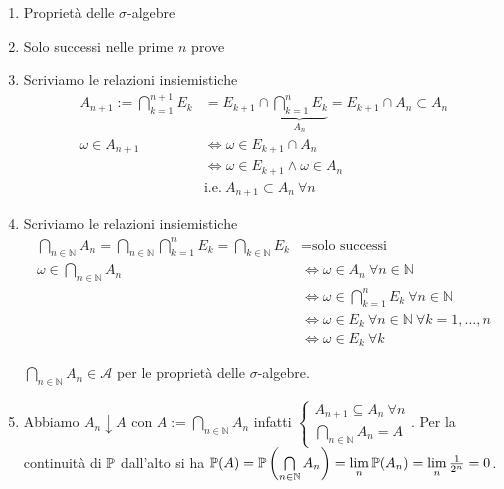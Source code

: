 \begin{enumerate}
\item Proprietà delle $\sigma $-algebre
\item Solo successi nelle prime $n$ prove
\item Scriviamo le relazioni insiemistiche\begin{align*}
A_{n+1} :=\bigcap\limits _{k=1}^{n+1} E_{k} & =E_{k+1} \cap \underbrace{\bigcap\limits _{k=1}^{n} E_{k}}_{A_{n}} =E_{k+1} \cap A_{n} \subset A_{n}\\
\omega \in A_{n+1} & \iff \omega \in E_{k+1} \cap A_{n}\\
 & \iff \omega \in E_{k+1} \land \omega \in A_{n}\\
 & \text{i.e.} \ A_{n+1} \subset A_{n} \ \forall n
\end{align*}
\item Scriviamo le relazioni insiemistiche\begin{align*}
\bigcap\limits _{n\in \mathbb{N}} A_{n} =\bigcap\limits _{n\in \mathbb{N}}\bigcap\limits _{k=1}^{n} E_{k} =\bigcap\limits _{k\in \mathbb{N}} E_{k} & =\text{solo successi}\\
\omega \in \bigcap\limits _{n\in \mathbb{N}} A_{n} & \iff \omega \in A_{n} \ \forall n\in \mathbb{N}\\
 & \iff \omega \in \bigcap\limits _{k=1}^{n} E_{k} \ \forall n\in \mathbb{N}\\
 & \iff \omega \in E_{k} \ \forall n\in \mathbb{N} \ \forall k=1,\dots ,n\\
 & \iff \omega \in E_{k} \ \forall k
\end{align*}

$\bigcap\limits _{n\in \mathbb{N}} A_{n} \in \mathcal{A}$ per le proprietà delle $\sigma $-algebre.
\item Abbiamo $A_{n} \downarrow A$ con $A:=\bigcap\limits _{n\in \mathbb{N}} A_{n}$ infatti $\begin{cases}
A_{n+1} \subseteq A_{n} \ \forall n\\
\bigcap_{n\in \mathbb{N}} A_{n} =A
\end{cases}$. Per la continuità di $\P$ dall'alto si ha $\P( A) =\P\left(\bigcap\limits _{n\in \mathbb{N}} A_{n}\right) =\lim\limits _{n}\P( A_{n}) =\lim\limits _{n}\frac{1}{2^{n}} =0$.
\end{enumerate}
\Soluzione
